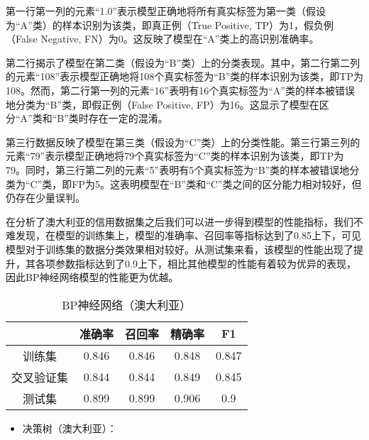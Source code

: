 \documentclass[12pt,a4paper]{nmmcm}
\begin{document}
第一行第一列的元素“1.0”表示模型正确地将所有真实标签为第一类（假设为“A”类）的样本识别为该类，即真正例（True Positive, TP）为1，假负例（False Negative, FN）为0。这反映了模型在“A”类上的高识别准确率。

第二行揭示了模型在第二类（假设为“B”类）上的分类表现。其中，第二行第二列的元素“108”表示模型正确地将108个真实标签为“B”类的样本识别为该类，即TP为108。然而，第二行第一列的元素“16”表明有16个真实标签为“A”类的样本被错误地分类为“B”类，即假正例（False Positive, FP）为16。这显示了模型在区分“A”类和“B”类时存在一定的混淆。

第三行数据反映了模型在第三类（假设为“C”类）上的分类性能。第三行第三列的元素“79”表示模型正确地将79个真实标签为“C”类的样本识别为该类，即TP为79。同时，第三行第二列的元素“5”表明有5个真实标签为“B”类的样本被错误地分类为“C”类，即FP为5。这表明模型在“B”类和“C”类之间的区分能力相对较好，但仍存在少量误判。

在分析了澳大利亚的信用数据集之后我们可以进一步得到模型的性能指标，我们不难发现，在模型的训练集上，模型的准确率、召回率等指标达到了0.85上下，可见模型对于训练集的数据分类效果相对较好。从测试集来看，该模型的性能出现了提升，其各项参数指标达到了0.9上下，相比其他模型的性能有着较为优异的表现，因此BP神经网络模型的性能更为优越。
\\

\begin{table}[H]
\centering
 \caption{BP神经网络（澳大利亚）}
\begin{tabular}{ccccc}
\hline
 & 准确率   & 召回率   & 精确率   & F1    \\
\hline
训练集   & 0.846 & 0.846 & 0.848 & 0.847 \\
交叉验证集 & 0.844 & 0.844 & 0.849 & 0.845 \\
测试集   & 0.899 & 0.899 & 0.906 & 0.9  \\
\hline
\end{tabular}
\end{table}
\begin{itemize}
   \item
   
决策树（澳大利亚）：
\end{itemize}
\end{document}
